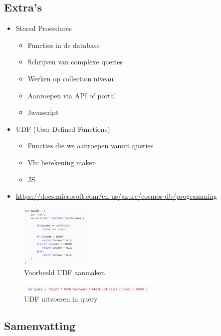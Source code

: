 \documentclass{article}
\begin{document}
\subsection{Extra's}

\begin{itemize}
    \item Stored Procedures
    \begin{itemize}
        \item Functies in de database
        \item Schrijven van complexe queries
        \item Werken op collection niveau
        \item Aanroepen via API of portal
        \item Javascript
    \end{itemize}
    \item UDF (User Defined Functions)
    \begin{itemize}
        \item Functies die we aanroepen vanuit queries
        \item Vb: berekening maken
        \item JS
    \end{itemize}
    \item \url{https://docs.microsoft.com/en-us/azure/cosmos-db/programming}
\end{itemize}

\begin{figure}[H]
    \centering
    \includegraphics[width=0.3\textwidth]{udf.png}
    \caption{Voorbeeld UDF aanmaken}
\end{figure}

\begin{figure}[H]
    \centering
    \includegraphics[width=0.6\textwidth]{udf2.png}
    \caption{UDF uitvoeren in query}
\end{figure}


\subsection{Samenvatting}
\end{document}
